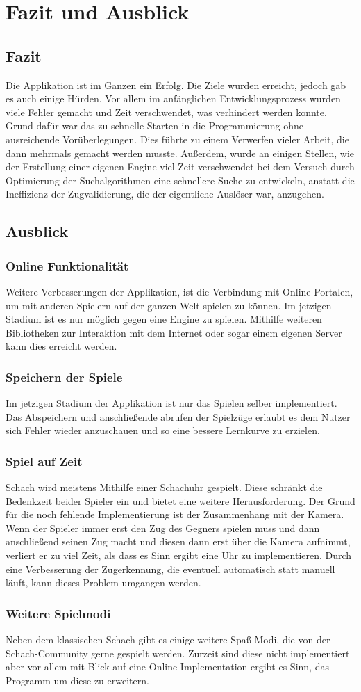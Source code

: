 \chapter{Fazit und Ausblick}
\section{Fazit}
Die Applikation ist im Ganzen ein Erfolg. Die Ziele wurden erreicht, jedoch gab es auch einige Hürden. 
Vor allem im anfänglichen Entwicklungsprozess wurden viele Fehler gemacht und Zeit verschwendet, was verhindert werden konnte. 
Grund dafür war das zu schnelle Starten in die Programmierung ohne ausreichende Vorüberlegungen. Dies führte zu einem Verwerfen vieler 
Arbeit, die dann mehrmals gemacht werden musste. Außerdem, wurde an einigen Stellen, wie der Erstellung einer eigenen Engine viel Zeit verschwendet bei dem 
Versuch durch Optimierung der Suchalgorithmen eine schnellere Suche zu entwickeln, anstatt die Ineffizienz der Zugvalidierung, die der eigentliche 
Auslöser war, anzugehen.  

\section{Ausblick}
\subsection{Online Funktionalität}
Weitere Verbesserungen der Applikation, ist die Verbindung mit Online Portalen, um mit anderen Spielern auf der ganzen Welt spielen zu können.
Im jetzigen Stadium ist es nur möglich gegen eine Engine zu spielen. Mithilfe weiteren Bibliotheken zur Interaktion mit dem Internet oder sogar einem 
eigenen Server kann dies erreicht werden.

\subsection{Speichern der Spiele}
Im jetzigen Stadium der Applikation ist nur das Spielen selber implementiert. Das Abspeichern und anschließende abrufen der Spielzüge erlaubt es dem Nutzer 
sich Fehler wieder anzuschauen und so eine bessere Lernkurve zu erzielen.

\subsection{Spiel auf Zeit}
Schach wird meistens Mithilfe einer Schachuhr gespielt. Diese schränkt die Bedenkzeit beider Spieler ein und bietet eine weitere Herausforderung. Der Grund 
für die noch fehlende Implementierung ist der Zusammenhang mit der Kamera. Wenn der Spieler immer erst den Zug des Gegners spielen muss und dann 
anschließend seinen Zug macht und diesen dann erst über die Kamera aufnimmt, verliert er zu viel Zeit, als dass es Sinn ergibt eine Uhr zu 
implementieren. Durch eine Verbesserung der Zugerkennung, die eventuell automatisch statt manuell läuft, kann dieses Problem umgangen werden.

\subsection{Weitere Spielmodi}
Neben dem klassischen Schach gibt es einige weitere Spaß Modi, die von der Schach-Community gerne gespielt werden. Zurzeit sind diese nicht implementiert aber
vor allem mit Blick auf eine Online Implementation ergibt es Sinn, das Programm um diese zu erweitern.